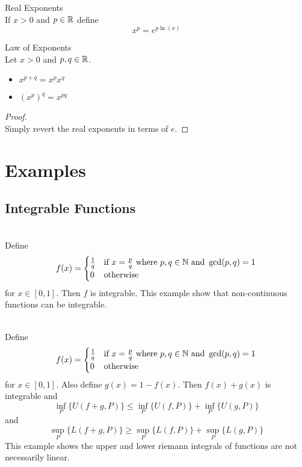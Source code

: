 \documentclass[a4paper]{article}
\begin{document}
\begin{defn}{Real Exponents}{}\\ If $x>0$ and $p\in\mathbb{R}$ define $$x^p=e^{p\ln(x)}$$
\end{defn}

\begin{thm}{Law of Exponents}{}\\ Let $x>0$ and $p,q\in\mathbb{R}$. 
\begin{itemize}
\item $x^{p+q}=x^px^q$
\item $(x^p)^q=x^{pq}$
\end{itemize}
\begin{proof}\\ Simply revert the real exponents in terms of $e$. 
\end{proof}
\end{thm}

\pagebreak
\section{Examples}
\subsection{Integrable Functions}
\begin{eg}{}{}\\ Define $$f(x)=\begin{cases}
\frac{1}{q} & \text{if } x=\frac{p}{q} \text{ where } p,q\in\mathbb{N} \text{ and } \gcd(p,q)=1\\
0 & \text{otherwise }
\end{cases}$$ for $x\in[0,1]$. Then $f$ is integrable. This example show that non-continuous functions can be integrable. 
\end{eg}

\begin{eg}{}{}\\ Define $$f(x)=\begin{cases}
\frac{1}{q} & \text{if } x=\frac{p}{q} \text{ where } p,q\in\mathbb{N} \text{ and } \gcd(p,q)=1\\
0 & \text{otherwise }
\end{cases}$$ for $x\in[0,1]$. Also define $g(x)=1-f(x)$.  Then $f(x)+g(x)$ is integrable and $$\inf_{P}\{U(f+g,P)\}\leq\inf_{P}\{U(f,P)\}+\inf_{P}\{U(g,P)\}$$ and $$\sup_{P}\{L(f+g,P)\}\geq\sup_{P}\{L(f,P)\}+\sup_{P}\{L(g,P)\}$$ This example shows the upper and lower riemann integrals of functions are not necessarily linear. 
\end{eg}
\end{document}
